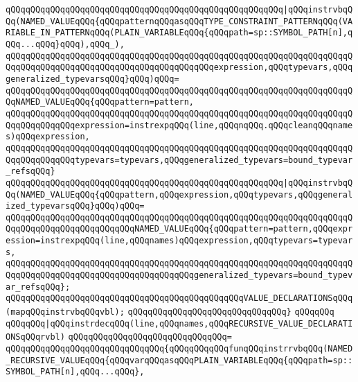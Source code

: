 \verb|qQQqqQQqqQQqqQQqqQQqqQQqqQQqqQQqqQQqqQQqqQQqqQQqqQQqqQQq|\verb#|qQQqinstrvbqQQq(NAMED_VALUEqQQq{qQQqpatternqQQqasqQQqTYPE_CONSTRAINT_PATTERNqQQq(VARIABLE_IN_PATTERNqQQq(PLAIN_VARIABLEqQQq{qQQqpath=sp::SYMBOL_PATH[n],qQQq...qQQq}qQQq),qQQq_),#\newline
\verb|qQQqqQQqqQQqqQQqqQQqqQQqqQQqqQQqqQQqqQQqqQQqqQQqqQQqqQQqqQQqqQQqqQQqqQQqqQQqqQQqqQQqqQQqqQQqqQQqqQQqqQQqqQQqqQQqexpression,qQQqtypevars,qQQqgeneralized_typevarsqQQq}qQQq)qQQq=|\newline
\verb|qQQqqQQqqQQqqQQqqQQqqQQqqQQqqQQqqQQqqQQqqQQqqQQqqQQqqQQqqQQqqQQqqQQqqQQqNAMED_VALUEqQQq{qQQqpattern=pattern,|\newline
\verb|qQQqqQQqqQQqqQQqqQQqqQQqqQQqqQQqqQQqqQQqqQQqqQQqqQQqqQQqqQQqqQQqqQQqqQQqqQQqqQQqqQQqexpression=instrexpqQQq(line,qQQqnqQQq.qQQqcleanqQQqnames)qQQqexpression,|\newline
\verb|qQQqqQQqqQQqqQQqqQQqqQQqqQQqqQQqqQQqqQQqqQQqqQQqqQQqqQQqqQQqqQQqqQQqqQQqqQQqqQQqqQQqtypevars=typevars,qQQqgeneralized_typevars=bound_typevar_refsqQQq}|\newline
\verb|qQQqqQQqqQQqqQQqqQQqqQQqqQQqqQQqqQQqqQQqqQQqqQQqqQQqqQQq|\verb#|qQQqinstrvbqQQq(NAMED_VALUEqQQq{qQQqpattern,qQQqexpression,qQQqtypevars,qQQqgeneralized_typevarsqQQq}qQQq)qQQq=#\newline
\verb|qQQqqQQqqQQqqQQqqQQqqQQqqQQqqQQqqQQqqQQqqQQqqQQqqQQqqQQqqQQqqQQqqQQqqQQqqQQqqQQqqQQqqQQqqQQqqQQqNAMED_VALUEqQQq{qQQqpattern=pattern,qQQqexpression=instrexpqQQq(line,qQQqnames)qQQqexpression,qQQqtypevars=typevars,|\newline
\verb|qQQqqQQqqQQqqQQqqQQqqQQqqQQqqQQqqQQqqQQqqQQqqQQqqQQqqQQqqQQqqQQqqQQqqQQqqQQqqQQqqQQqqQQqqQQqqQQqqQQqqQQqqQQqgeneralized_typevars=bound_typevar_refsqQQq};|\newline
\newline
\verb|qQQqqQQqqQQqqQQqqQQqqQQqqQQqqQQqqQQqqQQqqQQqqQQqVALUE_DECLARATIONSqQQq(mapqQQqinstrvbqQQqvbl);|\newline
\verb|qQQqqQQqqQQqqQQqqQQqqQQqqQQqqQQq}|\newline
\verb|qQQqqQQq|\newline
\verb|qQQqqQQq|\verb#|qQQqinstrdecqQQq(line,qQQqnames,qQQqRECURSIVE_VALUE_DECLARATIONSqQQqrvbl)#\newline
\verb|qQQqqQQqqQQqqQQqqQQqqQQqqQQqqQQq=|\newline
\verb|qQQqqQQqqQQqqQQqqQQqqQQqqQQqqQQq{qQQqqQQqqQQqfunqQQqinstrrvbqQQq(NAMED_RECURSIVE_VALUEqQQq{qQQqvarqQQqasqQQqPLAIN_VARIABLEqQQq{qQQqpath=sp::SYMBOL_PATH[n],qQQq...qQQq},|\newline
